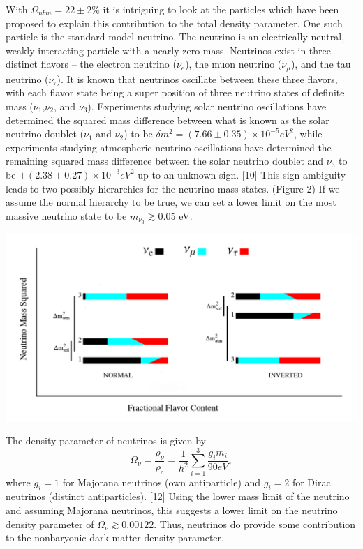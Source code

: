 \documentclass[a4paper,12pt]{article}
\begin{document}
With $\Omega_{nbm} = 22 \pm 2 \% $ it is intriguing to look at the particles which have been proposed to explain this contribution to the total density parameter. One such particle is the standard-model neutrino.  The neutrino is an electrically neutral, weakly interacting particle with a nearly zero mass.  Neutrinos exist in three distinct flavors -- the electron neutrino ($\nu_e$), the muon neutrino ($\nu_\mu$), and the tau neutrino ($\nu_\tau$).  It is known that neutrinos oscillate between these three flavors, with each flavor state being a super position of three neutrino states of definite mass ($\nu_1$,$\nu_2$, and $\nu_3$).  Experiments studying solar neutrino oscillations have determined the squared mass difference between what is known as the solar neutrino doublet ($\nu_1$ and $\nu_2$) to be $\delta m^2 = (7.66 \pm 0.35) \times 10^{-5} eV^2$, while experiments studying atmospheric neutrino oscillations have determined the remaining squared mass difference between the solar neutrino doublet and $\nu_3$ to be $\pm (2.38 \pm 0.27) \times 10^{-3} eV^2$ up to an unknown sign. [10]  This sign ambiguity leads to two possibly hierarchies for the neutrino mass states. (Figure 2)  If we assume the normal hierarchy to be true, we can set a lower limit on the most massive neutrino state to be $ m_{\nu_3} \gtrsim 0.05$ eV.

\begin{center}
\includegraphics[scale=0.4]{neutrinos.png}
\end{center}


The density parameter of neutrinos is given by
\[\Omega_\nu=\frac{\rho_\nu}{\rho_c}=\frac{1}{h^2}\sum_{i=1}^3 \frac{g_i m_i}{90eV},\]
where $g_i = 1$ for Majorana neutrinos (own antiparticle) and $g_i = 2$ for Dirac neutrinos (distinct antiparticles). [12] Using the lower mass limit of the neutrino and assuming Majorana neutrinos, this suggests a lower limit on the neutrino density parameter of $\Omega_\nu \gtrsim 0.00122$.  Thus, neutrinos do provide some contribution to the nonbaryonic dark matter density parameter.  
\end{document}
